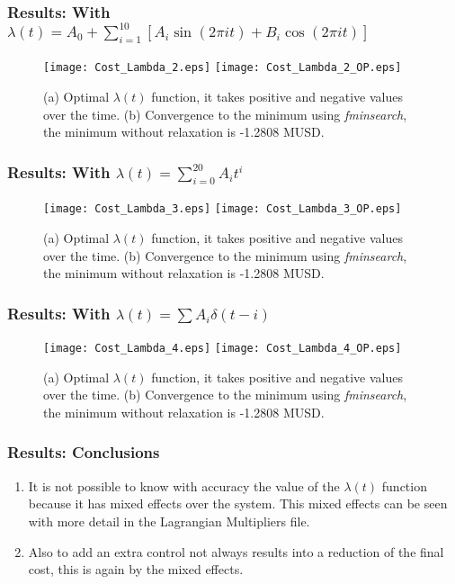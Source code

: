 \documentclass[aspectratio=169]{beamer}\usepackage[utf8]{inputenc}
\begin{document}
\begin{frame}\frametitle{Results: With $\lambda(t)=A_0+\sum_{i=1}^{10}\left[A_i\sin(2\pi i t)+B_i\cos(2\pi it)\right]$}
\begin{figure}[ht!]
\centering
\subfigure
{\texttt{[image: Cost\_Lambda\_2.eps]}}
\qquad
\subfigure
{\texttt{[image: Cost\_Lambda\_2\_OP.eps]}}
\caption
{(a) Optimal $\lambda(t)$ function, it takes positive and negative values over the time. (b) Convergence to the minimum using \emph{fminsearch}, the minimum without relaxation is -1.2808 MUSD.}
\end{figure}
\end{frame}

\begin{frame}\frametitle{Results: With $\lambda(t)=\sum_{i=0}^{20}A_it^i$}
\begin{figure}[ht!]
\centering
\subfigure
{\texttt{[image: Cost\_Lambda\_3.eps]}}
\qquad
\subfigure
{\texttt{[image: Cost\_Lambda\_3\_OP.eps]}}
\caption
{(a) Optimal $\lambda(t)$ function, it takes positive and negative values over the time. (b) Convergence to the minimum using \emph{fminsearch}, the minimum without relaxation is -1.2808 MUSD.}
\end{figure}
\end{frame}

\begin{frame}\frametitle{Results: With $\lambda(t)=\sum A_i\delta(t-i)$}
\begin{figure}[ht!]
\centering
\subfigure
{\texttt{[image: Cost\_Lambda\_4.eps]}}
\qquad
\subfigure
{\texttt{[image: Cost\_Lambda\_4\_OP.eps]}}
\caption
{(a) Optimal $\lambda(t)$ function, it takes positive and negative values over the time. (b) Convergence to the minimum using \emph{fminsearch}, the minimum without relaxation is -1.2808 MUSD.}
\end{figure}
\end{frame}

\begin{frame}\frametitle{Results: Conclusions}
\begin{enumerate}
\item It is not possible to know with accuracy the value of the $\lambda(t)$ function because it has mixed effects over the system. This mixed effects can be seen with more detail in the Lagrangian Multipliers file.
\item Also to add an extra control not always results into a reduction of the final cost, this is again by the mixed effects.
\end{enumerate}

\end{frame}
\end{document}
